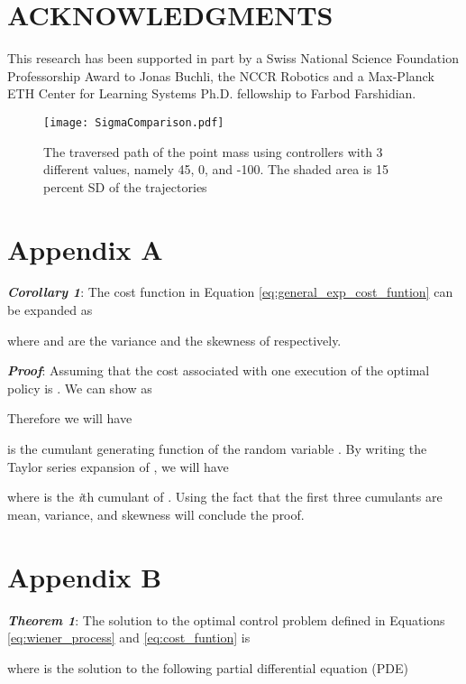 \documentclass[letterpaper, 10 pt, conference]{ieeeconf}
\begin{document}
\section{ACKNOWLEDGMENTS}
This research has been supported in part by a Swiss National Science
Foundation Professorship Award to Jonas Buchli, the NCCR Robotics and a
Max-Planck ETH Center for Learning Systems Ph.D. fellowship to Farbod Farshidian.











\onecolumn

\begin{figure*} [tpb]
\centering
\texttt{[image: SigmaComparison.pdf]}
\caption{The traversed path of the point mass using controllers with 3 different  values, namely 45, 0, and -100. The shaded area is 15 percent SD of the trajectories}
\label{fig:sigma_comparison}
\end{figure*}


\section{Appendix A}
\textbf{\textit{Corollary 1}}: The cost function in Equation \eqref{eq:general_exp_cost_funtion} can be expanded as

where  and  are the variance and the skewness of
 respectively.

\textbf{\textit{Proof}}: Assuming that the cost associated with one execution of
the optimal policy is . We can show  as

Therefore we will have

 is the cumulant
generating function of the random variable . By writing the Taylor
series expansion of , we will have

where  is the \textit{i}th cumulant of . Using the fact
that the first three cumulants are mean, variance, and skewness will conclude the
proof.

\section{Appendix B} 
\textbf{\textit{Theorem 1}}: The solution to the optimal control problem defined
in Equations \eqref{eq:wiener_process} and \eqref{eq:cost_funtion} is

where  is the solution to the following partial differential equation (PDE)
\end{document}
